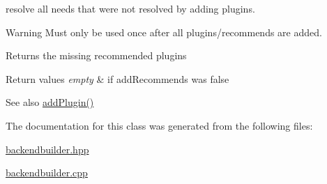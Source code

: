 resolve all needs that were not resolved by adding plugins. 

\begin{DoxyWarning}{Warning}
Must only be used once after all plugins/recommends are added.
\end{DoxyWarning}
\begin{DoxyReturn}{Returns}
the missing recommended plugins 
\end{DoxyReturn}

\begin{DoxyRetVals}{Return values}
{\em empty} & if add\+Recommends was false\\
\hline
\end{DoxyRetVals}
\begin{DoxySeeAlso}{See also}
\mbox{\hyperlink{classkdb_1_1tools_1_1BackendBuilder_a987d2c3711399e24b42c38e652c0e1c4}{add\+Plugin()}} 
\end{DoxySeeAlso}


The documentation for this class was generated from the following files\+:\begin{DoxyCompactItemize}
\item 
\mbox{\hyperlink{backendbuilder_8hpp}{backendbuilder.\+hpp}}\item 
\mbox{\hyperlink{backendbuilder_8cpp}{backendbuilder.\+cpp}}\end{DoxyCompactItemize}
